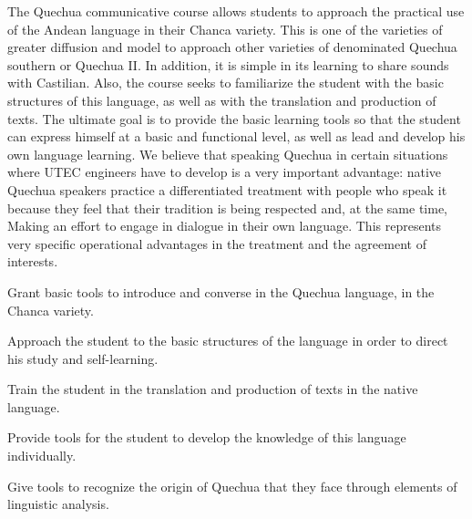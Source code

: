 \begin{syllabus}


\begin{justification}
The Quechua communicative course allows students to approach the practical use of the Andean language in their Chanca variety. This is one of the varieties of greater diffusion and model to approach other varieties of denominated Quechua southern or Quechua II. In addition, it is simple in its learning to share sounds with Castilian. Also, the course seeks to familiarize the student with the basic structures of this language, as well as with the translation and production of texts. The ultimate goal is to provide the basic learning tools so that the student can express himself at a basic and functional level, as well as lead and develop his own language learning.
We believe that speaking Quechua in certain situations where UTEC engineers have to develop is a very important advantage: native Quechua speakers practice a differentiated treatment with people who speak it because they feel that their tradition is being respected and, at the same time, Making an effort to engage in dialogue in their own language. This represents very specific operational advantages in the treatment and the agreement of interests. 
\end{justification}

\begin{goals}
\item Grant basic tools to introduce and converse in the Quechua language, in the Chanca variety.
\item Approach the student to the basic structures of the language in order to direct his study and self-learning.
\item Train the student in the translation and production of texts in the native language.
\item Provide tools for the student to develop the knowledge of this language individually.
\item Give tools to recognize the origin of Quechua that they face through elements of linguistic analysis.
\end{goals}

\begin{outcomes}
    \item {}
    \item {}
\end{outcomes}


\end{syllabus}
